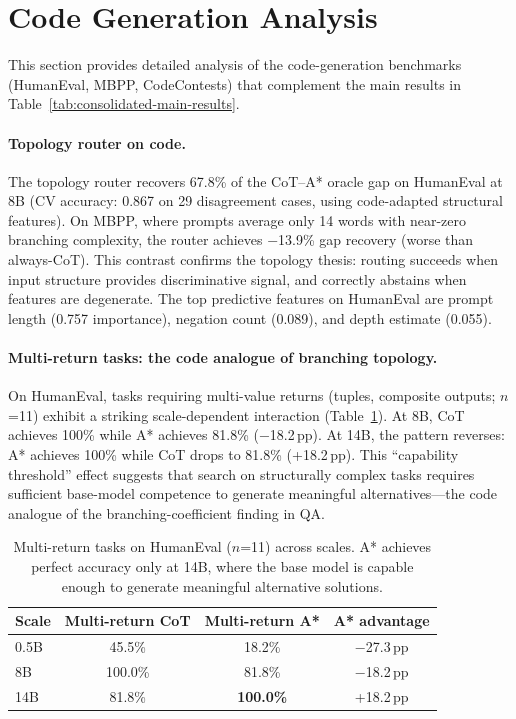 \documentclass[10pt]{article}
\begin{document}
{\color{red}
\section{Code Generation Analysis}
\label{app:code_generation}

This section provides detailed analysis of the code-generation benchmarks (HumanEval, MBPP, CodeContests) that complement the main results in Table~\ref{tab:consolidated-main-results}.

\paragraph{Topology router on code.}
The topology router recovers 67.8\% of the CoT--A* oracle gap on HumanEval at 8B (CV accuracy: 0.867 on 29 disagreement cases, using code-adapted structural features). On MBPP, where prompts average only 14 words with near-zero branching complexity, the router achieves $-$13.9\% gap recovery (worse than always-CoT). This contrast confirms the topology thesis: routing succeeds when input structure provides discriminative signal, and correctly abstains when features are degenerate. The top predictive features on HumanEval are prompt length (0.757 importance), negation count (0.089), and depth estimate (0.055).

\paragraph{Multi-return tasks: the code analogue of branching topology.}
On HumanEval, tasks requiring multi-value returns (tuples, composite outputs; $n$=11) exhibit a striking scale-dependent interaction (Table~\ref{tab:multi_return}). At 8B, CoT achieves 100\% while A* achieves 81.8\% ($-$18.2\,pp). At 14B, the pattern reverses: A* achieves 100\% while CoT drops to 81.8\% (+18.2\,pp). This ``capability threshold'' effect suggests that search on structurally complex tasks requires sufficient base-model competence to generate meaningful alternatives---the code analogue of the branching-coefficient finding in QA.

\begin{table}[ht]
\centering
\small
\begin{tabular}{lccc}
\toprule
\textbf{Scale} & \textbf{Multi-return CoT} & \textbf{Multi-return A*} & \textbf{A* advantage} \\
\midrule
0.5B  & 45.5\% & 18.2\% & $-$27.3\,pp \\
8B    & 100.0\% & 81.8\% & $-$18.2\,pp \\
14B   & 81.8\% & \textbf{100.0\%} & +18.2\,pp \\
\bottomrule
\end{tabular}
\caption{Multi-return tasks on HumanEval ($n$=11) across scales. A* achieves perfect accuracy only at 14B, where the base model is capable enough to generate meaningful alternative solutions.}
\label{tab:multi_return}
\end{table}

}
\end{document}
